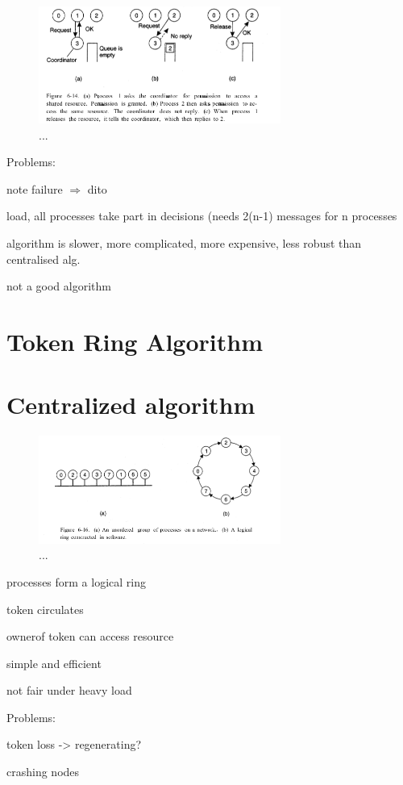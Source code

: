 \documentclass[ngerman,a4paper]{report}
\begin{document}
\begin{figure}[h]
	\centering
	\includegraphics[width=300px]{gfx/mutex-distributed.png}
	\caption{...}
	\label{img:mutex-distributed}
\end{figure}




Problems: \begin{compactitem}
		
	\item note failure $\Rightarrow$ dito
	\item load, all processes take part in decisions (needs 2(n-1) messages for n processes
	\item algorithm is slower, more complicated, more expensive, less robust than centralised alg.
	\item not a good algorithm
\end{compactitem}

\section{Token Ring Algorithm}

\section{Centralized algorithm}
\begin{figure}[h]
	\centering
	\includegraphics[width=300px]{gfx/mutex-token.png}
	\caption{...}
	\label{img:mutex-token}
\end{figure}


\begin{compactitem}
	\item processes form a logical ring
	\item token circulates
	\item ownerof token can access resource
	\item simple and efficient
	\item not fair under heavy load
\end{compactitem}
Problems:\begin{compactitem}
	\item token loss -> regenerating?
	\item crashing nodes
\end{compactitem}
\end{document}
